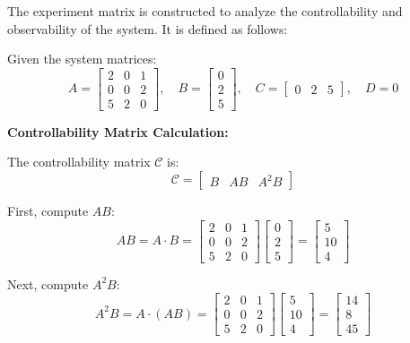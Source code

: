 The experiment matrix is constructed to analyze the controllability and observability of the system. It is defined as follows:

Given the system matrices:
\[
    A = \begin{bmatrix}
        2 & 0 & 1 \\
        0 & 0 & 2 \\
        5 & 2 & 0
    \end{bmatrix}, \quad
    B = \begin{bmatrix}
        0 \\ 2 \\ 5
    \end{bmatrix}, \quad
    C = \begin{bmatrix}
        0 & 2 & 5
    \end{bmatrix}, \quad
    D = 0
\]

\textbf{Controllability Matrix Calculation:}

The controllability matrix $\mathcal{C}$ is:
\[
    \mathcal{C} = \begin{bmatrix} B & AB & A^2B \end{bmatrix}
\]

First, compute $AB$:
\[
    AB = A \cdot B =
    \begin{bmatrix}
        2 & 0 & 1 \\
        0 & 0 & 2 \\
        5 & 2 & 0
    \end{bmatrix}
    \begin{bmatrix}
        0 \\ 2 \\ 5
    \end{bmatrix}
    =
    \begin{bmatrix}
        5 \\ 10 \\ 4
    \end{bmatrix}
\]

Next, compute $A^2B$:
\[
    A^2B = A \cdot (AB) =
    \begin{bmatrix}
        2 & 0 & 1 \\
        0 & 0 & 2 \\
        5 & 2 & 0
    \end{bmatrix}
    \begin{bmatrix}
        5 \\ 10 \\ 4
    \end{bmatrix}
    =
    \begin{bmatrix}
        14 \\ 8 \\ 45
    \end{bmatrix}
\]

